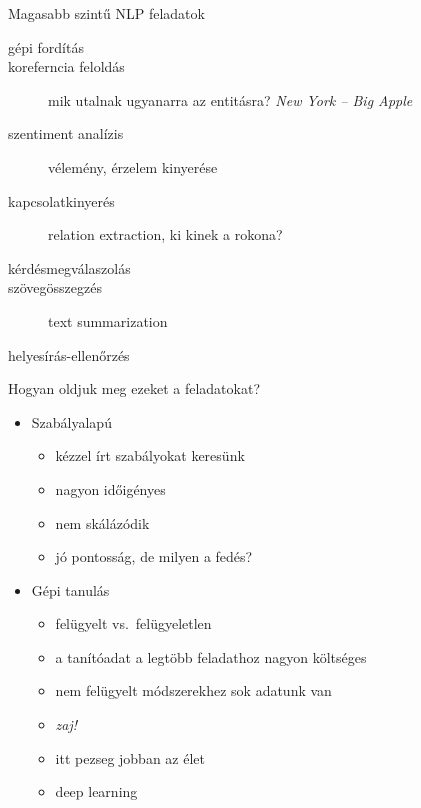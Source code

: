 \documentclass[xcolor=rgb]{beamer}
\begin{document}
\begin{frame}{Magasabb szintű NLP feladatok}
    \begin{description}
            \pause
        \item[gépi fordítás]
        \item[koreferncia feloldás] mik utalnak ugyanarra az entitásra? \emph{New York -- Big Apple}
        \item[szentiment analízis] vélemény, érzelem kinyerése
        \item[kapcsolatkinyerés] relation extraction, ki kinek a rokona?
        \item[kérdésmegválaszolás]
        \item[szövegösszegzés] text summarization
        \item[helyesírás-ellenőrzés]
    \end{description}
\end{frame}


\begin{frame}{Hogyan oldjuk meg ezeket a feladatokat?}
    \begin{itemize}
            \pause
        \item Szabályalapú
            \pause
            \begin{itemize}
                \item kézzel írt szabályokat keresünk
                    \pause
                \item nagyon időigényes
                    \pause
                \item nem skálázódik
                    \pause
                \item jó pontosság, de milyen a fedés?
            \end{itemize}
                    \pause
        \item Gépi tanulás
            \pause
            \begin{itemize}
                \item felügyelt vs.~felügyeletlen
                    \pause
                \item a tanítóadat a legtöbb feladathoz nagyon költséges
                    \pause
                \item nem felügyelt módszerekhez sok adatunk van
                    \pause
                \item \emph{zaj!}
                    \pause
                \item itt pezseg jobban az élet
                    \pause
                \item deep learning
            \end{itemize}
    \end{itemize}
\end{frame}
\end{document}
